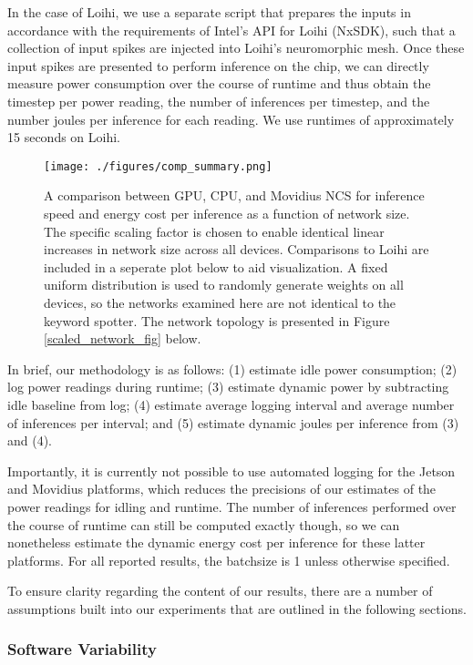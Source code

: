 \documentclass[sigconf, screen]{acmart}
\begin{document}
In the case of Loihi, we use a separate script that prepares the inputs in accordance with the requirements of Intel's API for Loihi (NxSDK), such that a collection of input spikes are injected into Loihi's neuromorphic mesh. Once these input spikes are presented to perform inference on the chip, we can directly measure power consumption over the course of runtime and thus obtain the timestep per power reading, the number of inferences per timestep, and the number joules per inference for each reading. We use runtimes of approximately 15 seconds on Loihi.

\begin{figure*}[ht!]
\centering
    \texttt{[image: ./figures/comp\_summary.png]}
	\caption{A comparison between GPU, CPU, and Movidius NCS for inference speed and energy cost per inference as a function of network size. The specific scaling factor is chosen to enable identical linear increases in network size across all devices. Comparisons to Loihi are included in a seperate plot below to aid visualization. A fixed uniform distribution is used to randomly generate weights on all devices, so the networks examined here are not identical to the keyword spotter. The network topology is presented in Figure \ref{scaled_network_fig} below.}
\label{comp_fig}
\end{figure*}

In brief, our methodology is as follows: (1) estimate idle power consumption; (2) log power readings during runtime; (3) estimate dynamic power by subtracting idle baseline from log; (4) estimate average logging interval and average number of inferences per interval; and (5) estimate dynamic joules per inference from (3) and (4).

Importantly, it is currently not possible to use automated logging for the Jetson and Movidius platforms, which reduces the precisions of our estimates of the power readings for idling and runtime. The number of inferences performed over the course of runtime can still be computed exactly though, so we can nonetheless estimate the dynamic energy cost per inference for these latter platforms. For all reported results, the batchsize is 1 unless otherwise specified.

To ensure clarity regarding the content of our results, there are a number of assumptions built into our experiments that are outlined in the following sections.

\subsubsection{Software Variability}
\end{document}
